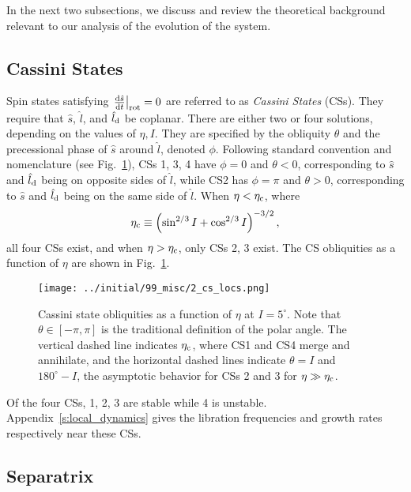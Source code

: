 \documentclass[
        fleqn,
        usenatbib,
        referee,
    ]{mnras}
\newcommand*{\rd}[2]{\frac{\mathrm{d}#1}{\mathrm{d}#2}}
\newcommand*{\at}[1]{\left.#1\right|}
\newcommand*{\p}[1]{\left(#1\right)}
\begin{document}
In the next two subsections, we discuss and review the theoretical background
relevant to our analysis of the evolution of the system.

\subsection{Cassini States}\label{ss:cs}

Spin states satisfying $\at{\rd{\hat{s}}{t}}_{\rm rot} = 0$ are referred to as
\emph{Cassini States} (CSs). They require that $\hat{s}$, $\hat{l}$, and
$\hat{l}_{\rm d}$ be coplanar. There are either two or four solutions, depending
on the values of $\eta, I$. They are specified by the obliquity $\theta$ and the
precessional phase of $\hat{s}$ around $\hat{l}$, denoted $\phi$. Following
standard convention and nomenclature (see Fig.~\ref{fig:cs_locs}), CSs 1, 3, 4
have $\phi = 0$ and $\theta < 0$, corresponding to $\hat{s}$ and $\hat{l}_{\rm
d}$ being on opposite sides of $\hat{l}$, while CS2 has $\phi = \pi$ and $\theta
> 0$, corresponding to $\hat{s}$ and $\hat{l}_{\rm d}$ being on the same side of
$\hat{l}$. When $\eta < \eta_{\rm c}$, where
\begin{equation}
    \eta_{\rm c} \equiv \p{\sin^{2/3}I + \cos^{2/3}I}^{-3/2},\label{eq:etac}
\end{equation}
all four CSs exist, and when $\eta > \eta_{\rm c}$, only CSs 2, 3 exist. The CS
obliquities as a function of $\eta$ are shown in Fig.~\ref{fig:cs_locs}.
\begin{figure}
    \centering
    \texttt{[image: ../initial/99\_misc/2\_cs\_locs.png]}
    \caption{Cassini state obliquities as a function of $\eta$ at $I = 5^\circ$.
    Note that $\theta \in [-\pi, \pi]$ is the traditional definition of the
    polar angle. The vertical dashed line indicates $\eta_{\rm c}$, where CS1
    and CS4 merge and annihilate, and the horizontal dashed lines indicate
    $\theta = I$ and $180^\circ - I$, the asymptotic behavior for CSs 2 and 3
    for $\eta \gg \eta_{\rm c}$.}\label{fig:cs_locs}
\end{figure}

Of the four CSs, 1, 2, 3 are stable while 4 is unstable.
Appendix~\ref{s:local_dynamics} gives the libration frequencies and growth rates
respectively near these CSs.

\subsection{Separatrix}
\end{document}
